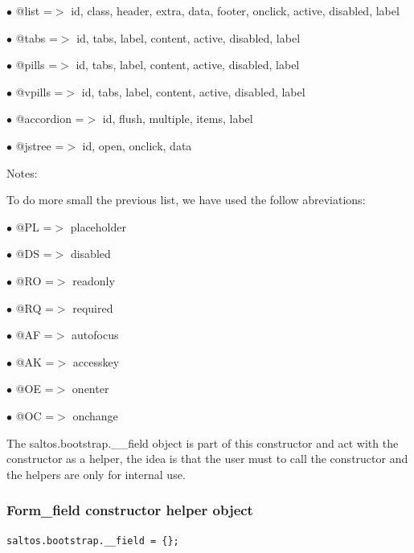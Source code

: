 \documentclass[a4paper]{article}
\begin{document}
\begin{compactitem}
\item[\color{myblue}$\bullet$] @list        =$>$ id, class, header, extra, data, footer, onclick, active, disabled, label
\item[\color{myblue}$\bullet$] @tabs        =$>$ id, tabs, label, content, active, disabled, label
\item[\color{myblue}$\bullet$] @pills       =$>$ id, tabs, label, content, active, disabled, label
\item[\color{myblue}$\bullet$] @vpills      =$>$ id, tabs, label, content, active, disabled, label
\item[\color{myblue}$\bullet$] @accordion   =$>$ id, flush, multiple, items, label
\item[\color{myblue}$\bullet$] @jstree      =$>$ id, open, onclick, data
\end{compactitem}

Notes:

To do more small the previous list, we have used the follow abreviations:

\begin{compactitem}
\item[\color{myblue}$\bullet$] @PL =$>$ placeholder
\item[\color{myblue}$\bullet$] @DS =$>$ disabled
\item[\color{myblue}$\bullet$] @RO =$>$ readonly
\item[\color{myblue}$\bullet$] @RQ =$>$ required
\item[\color{myblue}$\bullet$] @AF =$>$ autofocus
\item[\color{myblue}$\bullet$] @AK =$>$ accesskey
\item[\color{myblue}$\bullet$] @OE =$>$ onenter
\item[\color{myblue}$\bullet$] @OC =$>$ onchange
\end{compactitem}

The saltos.bootstrap.\_\_field object is part of this constructor and act with the constructor
as a helper, the idea is that the user must to call the constructor and the helpers are
only for internal use.

\hypertarget{toc44}{}
\subsubsection{Form\_field constructor helper object}

\begin{lstlisting}
saltos.bootstrap.__field = {};
\end{lstlisting}
\end{document}
